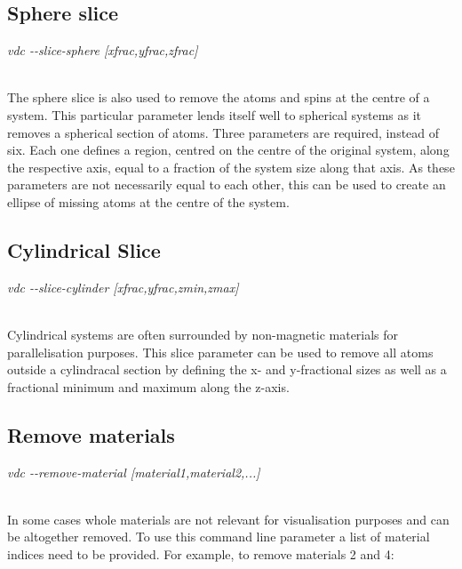 \subsection*{Sphere slice}

\begin{minipage}[c]{\textwidth}
\centering
\textit{vdc -{}-slice-sphere [xfrac,yfrac,zfrac]}
\end{minipage}\\

The sphere slice is also used to remove the atoms and spins at the centre of a system. This particular parameter lends itself well to spherical systems as it removes a spherical section of atoms. Three parameters are required, instead of six. Each one defines a region, centred on the centre of the original system, along the respective axis, equal to a fraction of the system size along that axis. As these parameters are not necessarily equal to each other, this can be used to create an ellipse of missing atoms at the centre of the system.

\subsection*{Cylindrical Slice}

\begin{minipage}[c]{\textwidth}
\centering
\textit{vdc -{}-slice-cylinder [xfrac,yfrac,zmin,zmax]}
\end{minipage}\\

Cylindrical systems are often surrounded by non-magnetic materials for parallelisation purposes. This slice parameter can be used to remove all atoms outside a cylindracal section by defining the x- and y-fractional sizes as well as a fractional minimum and maximum along the z-axis.

\subsection*{Remove materials}

\begin{minipage}[c]{\textwidth}
\centering
\textit{vdc -{}-remove-material [material1,material2,...]}
\end{minipage}\\

In some cases whole materials are not relevant for visualisation purposes and can be altogether removed. To use this command line parameter a list of material indices need to be provided. For example, to remove materials 2 and 4:

